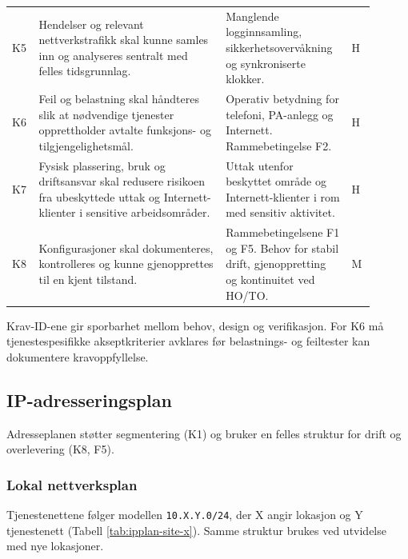 \begin{longtable}{>{\raggedright\arraybackslash}p{0.055\linewidth} >{\raggedright\arraybackslash}p{0.48\linewidth} >{\raggedright\arraybackslash}p{0.30\linewidth} >{\centering\arraybackslash}p{0.065\linewidth}}
K5 & Hendelser og relevant nettverkstrafikk skal kunne samles inn og analyseres sentralt med felles tidsgrunnlag. & Manglende logginnsamling, sikkerhetsovervåkning og synkroniserte klokker. & H \\
\addlinespace
K6 & Feil og belastning skal håndteres slik at nødvendige tjenester opprettholder avtalte funksjons- og tilgjengelighetsmål. & Operativ betydning for telefoni, PA-anlegg og Internett. Rammebetingelse F2. & H \\
\addlinespace
K7 & Fysisk plassering, bruk og driftsansvar skal redusere risikoen fra ubeskyttede uttak og Internett-klienter i sensitive arbeidsområder. & Uttak utenfor beskyttet område og Internett-klienter i rom med sensitiv aktivitet. & H \\
\addlinespace
K8 & Konfigurasjoner skal dokumenteres, kontrolleres og kunne gjenopprettes til en kjent tilstand. & Rammebetingelsene F1 og F5. Behov for stabil drift, gjenoppretting og kontinuitet ved HO/TO. & M \\
\end{longtable}
\endgroup

Krav-ID-ene gir sporbarhet mellom behov, design og verifikasjon. For K6 må tjenestespesifikke akseptkriterier avklares før belastnings- og feiltester kan dokumentere kravoppfyllelse.

\subsection{IP-adresseringsplan}
Adresseplanen støtter segmentering (K1) og bruker en felles struktur for drift og overlevering (K8, F5).

\subsubsection{Lokal nettverksplan}
Tjenestenettene følger modellen \texttt{10.X.Y.0/24}, der X angir lokasjon og Y tjenestenett (Tabell \ref{tab:ipplan-site-x}). Samme struktur brukes ved utvidelse med nye lokasjoner.

